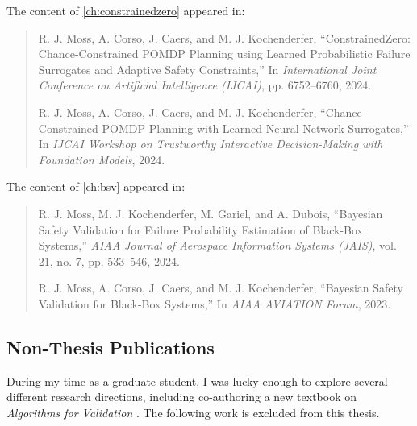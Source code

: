 \noindent The content of \cref{ch:constrainedzero} appeared in:
\begin{quote}
    \cite{moss2024constrainedzero} R. J. Moss, A. Corso, J. Caers, and M. J. Kochenderfer, ``ConstrainedZero: Chance-Constrained POMDP Planning using Learned Probabilistic Failure Surrogates and Adaptive Safety Constraints,'' In \textit{International Joint Conference on Artificial Intelligence (IJCAI)}, pp. 6752--6760, 2024.\\

    \phantom{---}

    \cite{moss2024constrainedzeroworkshop} R. J. Moss, A. Corso, J. Caers, and M. J. Kochenderfer, ``Chance-Constrained POMDP Planning with Learned Neural Network Surrogates,'' In \textit{IJCAI Workshop on Trustworthy Interactive Decision-Making with Foundation Models}, 2024.\\
\end{quote}

\phantom{---}

\noindent The content of \cref{ch:bsv} appeared in:
\begin{quote}
    \cite{moss2024bayesian} R. J. Moss, M. J. Kochenderfer, M. Gariel, and A. Dubois, ``Bayesian Safety Validation for Failure Probability Estimation of Black-Box Systems,'' \textit{AIAA Journal of Aerospace Information Systems (JAIS)}, vol. 21, no. 7, pp. 533--546, 2024.\\

    \phantom{---}

    \cite{moss2023bayesian} R. J. Moss, A. Corso, J. Caers, and M. J. Kochenderfer, ``Bayesian Safety Validation for Black-Box Systems,'' In \textit{AIAA AVIATION Forum}, 2023.\\
\end{quote}

\phantom{---}

\subsection{Non-Thesis Publications}
During my time as a graduate student, I was lucky enough to explore several different research directions, including co-authoring a new textbook on \textit{Algorithms for Validation} \cite{valbook}.
The following work is excluded from this thesis.


